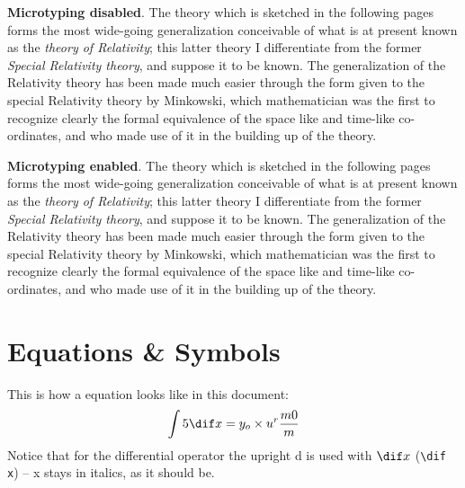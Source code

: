 \textbf{Microtyping disabled}. The theory which is sketched in the following pages forms the most wide-going generalization conceivable of what is at present known as the \emph{theory of Relativity}; this latter theory I differentiate from the former \emph{Special Relativity theory}, and suppose it to be known. The generalization of the Relativity theory has been made much easier through the form given to the special Relativity theory by Minkowski, which mathematician was the first to recognize clearly the formal equivalence of the space like and time-like co-ordinates, and who made use of it in the building up of the theory.

\textbf{Microtyping enabled}. The theory which is sketched in the following pages forms the most wide-going generalization conceivable of what is at present known as the \emph{theory of Relativity}; this latter theory I differentiate from the former \emph{Special Relativity theory}, and suppose it to be known. The generalization of the Relativity theory has been made much easier through the form given to the special Relativity theory by Minkowski, which mathematician was the first to recognize clearly the formal equivalence of the space like and time-like co-ordinates, and who made use of it in the building up of the theory.
 
\section{Equations \& Symbols} %
\label{sec:equations}
This is how a equation looks like in this document:
\begin{align}
	\int 5 \dif x = y_o \times u^r \frac{m 0}{m}
\end{align}
Notice that for the differential operator the upright d is used with $\dif x$ (\verb|\dif x|) -- x stays in italics, as it should be.

